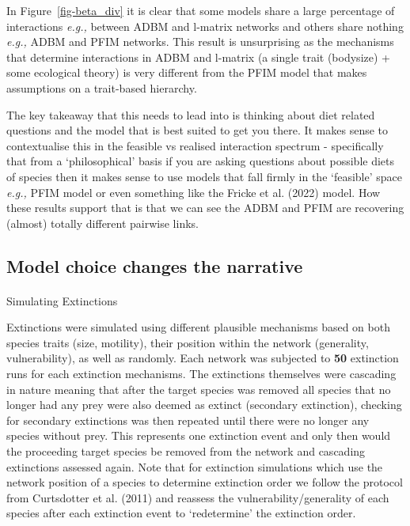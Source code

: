 \documentclass[
]{article}
\makeatletter
\let\oldparagraph\paragraph
\renewcommand{\paragraph}{
    \@ifstar
      \xxxParagraphStar
      \xxxParagraphNoStar
  }
\newcommand{\xxxParagraphStar}[1]{\oldparagraph*{#1}\mbox{}}
\newcommand{\xxxParagraphNoStar}[1]{\oldparagraph{#1}\mbox{}}
\makeatother
\begin{document}
In Figure~\ref{fig-beta_div} it is clear that some models share a large
percentage of interactions \emph{e.g.,} between ADBM and l-matrix
networks and others share nothing \emph{e.g.,} ADBM and PFIM networks.
This result is unsurprising as the mechanisms that determine
interactions in ADBM and l-matrix (a single trait (bodysize) + some
ecological theory) is very different from the PFIM model that makes
assumptions on a trait-based hierarchy.

The key takeaway that this needs to lead into is thinking about diet
related questions and the model that is best suited to get you there. It
makes sense to contextualise this in the feasible vs realised
interaction spectrum - specifically that from a `philosophical' basis if
you are asking questions about possible diets of species then it makes
sense to use models that fall firmly in the `feasible' space
\emph{e.g.,} PFIM model or even something like the Fricke et al. (2022)
model. How these results support that is that we can see the ADBM and
PFIM are recovering (almost) totally different pairwise links.

\subsection{Model choice changes the
narrative}\label{model-choice-changes-the-narrative}

\paragraph{Simulating Extinctions}\label{simulating-extinctions}

Extinctions were simulated using different plausible mechanisms based on
both species traits (size, motility), their position within the network
(generality, vulnerability), as well as randomly. Each network was
subjected to \textbf{50} extinction runs for each extinction mechanisms.
The extinctions themselves were cascading in nature meaning that after
the target species was removed all species that no longer had any prey
were also deemed as extinct (secondary extinction), checking for
secondary extinctions was then repeated until there were no longer any
species without prey. This represents one extinction event and only then
would the proceeding target species be removed from the network and
cascading extinctions assessed again. Note that for extinction
simulations which use the network position of a species to determine
extinction order we follow the protocol from Curtsdotter et al. (2011)
and reassess the vulnerability/generality of each species after each
extinction event to `redetermine' the extinction order.
\end{document}
